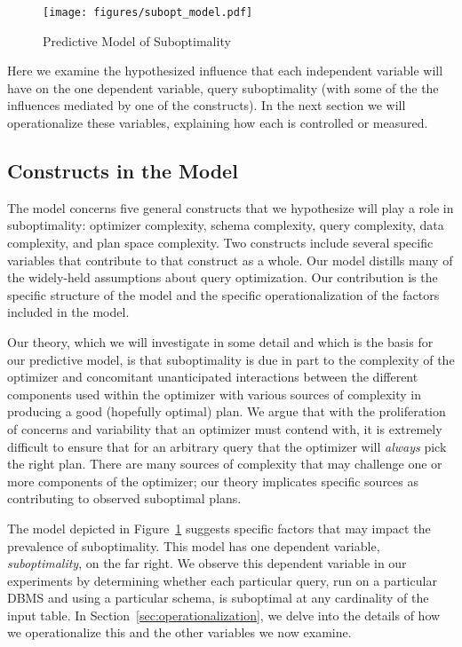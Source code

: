 \documentclass[prodmode,acmtods]{acmsmall}
\begin{document}
\begin{figure}[tb]
\centering
\texttt{[image: figures/subopt\_model.pdf]}
\caption{Predictive Model of Suboptimality\label{fig:model}}
\vspace*{3ex}
\end{figure}

Here we examine the hypothesized influence that each independent
variable will have on the one dependent variable, query suboptimality (with
some of the the influences mediated by one of the constructs). In
the next section we will operationalize these variables, explaining how
each is controlled or measured.

\subsection{Constructs in the Model}

The model concerns five general
constructs that we \hbox{hypothesize} will play a role in suboptimality: optimizer
complexity, schema complexity, query complexity, data complexity, and plan space complexity.
Two constructs include several specific variables that contribute to that
construct as a whole. Our model distills many of the widely-held assumptions
about query optimization. Our contribution is the specific \hbox{structure} of
the model and the specific operationalization of the
\hbox{factors} included in the model.

Our theory, which we will investigate in some detail and which is the
basis for our predictive model, is that suboptimality is due in part
to the complexity of the optimizer and concomitant unanticipated
interactions between the different components used within the 
optimizer with various sources of complexity in producing a good (hopefully
optimal) plan.  We argue that with the proliferation of concerns and
variability that an optimizer must contend with, it is extremely
difficult to ensure that for an arbitrary query that the optimizer
will {\em always} pick the right plan. There are many sources of complexity
that may challenge one or more components of the optimizer; our theory
implicates specific sources as contributing to observed
suboptimal plans.

The model depicted in Figure~\ref{fig:model} suggests specific factors that may
impact the prevalence of suboptimality. This model has one dependent
variable, {\em suboptimality}, on the far right. We observe this dependent
variable in our experiments by determining whether each particular query,
run on a particular \hbox{DBMS} and using a particular schema,
is suboptimal at any cardinality of the input table. In Section~\ref{sec:operationalization}, we
delve into the details of how we operationalize this and the other variables
we now examine.
\end{document}
